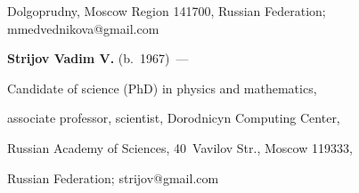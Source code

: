 Dolgoprudny, Moscow Region 141700, Russian Federation; mmedvednikova@gmail.com





\vspace*{1pt}





\noindent


\textbf{Strijov Vadim V.} (b.\ 1967)~---


Candidate of science (PhD) in physics and mathematics,


associate professor, scientist, Dorodnicyn Computing Center,


Russian Academy of Sciences, 40~Vavilov Str., Moscow 119333,


Russian Federation; strijov@gmail.com





 \label{end\stat}








\renewcommand{\bibname}{\protect\rm Литература}











